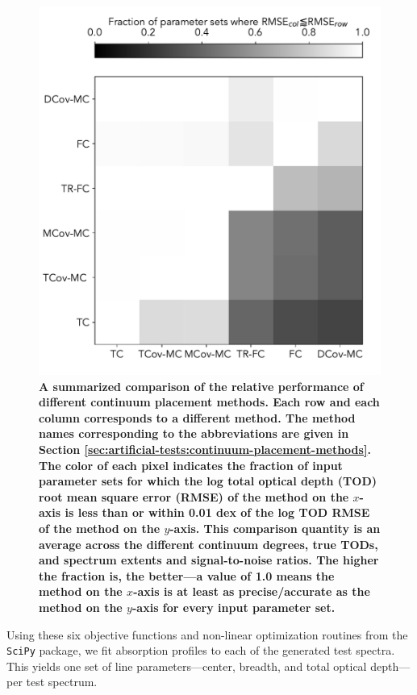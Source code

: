 \documentclass[manuscript]{aastex62}
\begin{document}
{\begin{figure}
  \includegraphics[width=\linewidth]{figures/overall-performance.pdf}
  \caption{
  \bf
  A summarized comparison of the relative performance of different continuum placement methods.
  Each row and each column corresponds to a different method.
  The method names corresponding to the abbreviations are given in Section \ref{sec:artificial-tests:continuum-placement-methods}.
  The color of each pixel indicates the fraction of input parameter sets for which the log total optical depth (TOD) root mean square error (RMSE) of the method on the $x$-axis is less than or within 0.01 dex of the log TOD RMSE of the method on the $y$-axis.
  This comparison quantity is an average across the different continuum degrees, true TODs, and spectrum extents and signal-to-noise ratios.
  The higher the fraction is, the better---a value of 1.0 means the method on the $x$-axis is at least as precise/accurate as the method on the $y$-axis for every input parameter set.
  }
  \label{fig:outcomes-summary}
\end{figure}
Using these six objective functions and non-linear optimization routines from the \texttt{SciPy} package, we fit absorption profiles to each of the generated test spectra.
This yields one set of line parameters---center, breadth, and total optical depth---per test spectrum.
}
\end{document}
